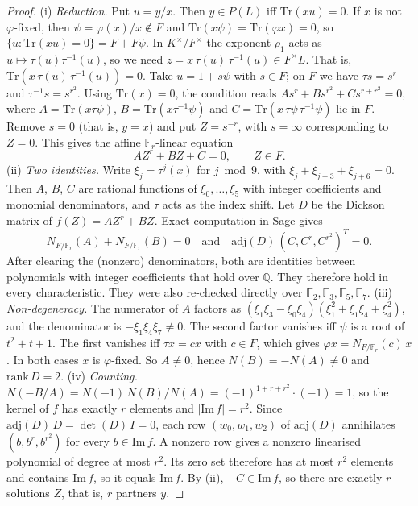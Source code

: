 \documentclass[11pt]{article}
\begin{document}
\begin{proof}
(i) \emph{Reduction.} Put $u=y/x$. Then $y\in P(L)$ iff $\mathrm{Tr}(xu)=0$. If $x$ is not $\varphi$-fixed, then $\psi=\varphi(x)/x\notin F$ and
$\mathrm{Tr}(x\psi)=\mathrm{Tr}(\varphi x)=0$, so $\{u:\mathrm{Tr}(xu)=0\}=F+F\psi$.
In $K^\times/F^\times$ the exponent $\rho_1$ acts as $u\mapsto\tau(u)\tau^{-1}(u)$, so we need $z=x\,\tau(u)\,\tau^{-1}(u)\in F^\times L$. That is, $\mathrm{Tr}(x\,\tau(u)\,\tau^{-1}(u))=0$.
Take $u=1+s\psi$ with $s\in F$; on $F$ we have $\tau s=s^r$ and $\tau^{-1}s=s^{r^2}$. Using $\mathrm{Tr}(x)=0$, the condition reads $As^r+Bs^{r^2}+Cs^{r+r^2}=0$, where
$A=\mathrm{Tr}(x\tau\psi)$, $B=\mathrm{Tr}(x\tau^{-1}\psi)$ and $C=\mathrm{Tr}(x\,\tau\psi\,\tau^{-1}\psi)$ lie in $F$.
Remove $s=0$ (that is, $y=x$) and put $Z=s^{-r}$, with $s=\infty$ corresponding to $Z=0$. This gives the affine $\mathbb F_r$-linear equation
\[A Z^r+BZ+C=0,\qquad Z\in F.\]
(ii) \emph{Two identities.} Write $\xi_j=\tau^j(x)$ for $j\bmod 9$, with $\xi_j+\xi_{j+3}+\xi_{j+6}=0$. Then $A$, $B$, $C$ are rational functions of $\xi_0,\dots,\xi_5$
with integer coefficients and monomial denominators, and $\tau$ acts as the index shift. Let $D$ be the Dickson matrix of $f(Z)=AZ^r+BZ$. Exact computation in Sage gives
\[N_{F/\mathbb F_r}(A)+N_{F/\mathbb F_r}(B)=0\quad\text{and}\quad \mathrm{adj}(D)\,(C,C^r,C^{r^2})^{T}=0.\]
After clearing the (nonzero) denominators, both are identities between polynomials with integer coefficients that hold over $\mathbb Q$. They therefore hold in every characteristic.
They were also re-checked directly over $\mathbb F_2,\mathbb F_3,\mathbb F_5,\mathbb F_7$.
(iii) \emph{Non-degeneracy.} The numerator of $A$ factors as $(\xi_1\xi_3-\xi_0\xi_4)(\xi_1^2+\xi_1\xi_4+\xi_4^2)$, and the denominator is $-\xi_1\xi_4\xi_7\ne0$.
The second factor vanishes iff $\psi$ is a root of $t^2+t+1$. The first vanishes iff $\tau x=cx$ with $c\in F$, which gives $\varphi x=N_{F/\mathbb F_r}(c)\,x$.
In both cases $x$ is $\varphi$-fixed. So $A\ne0$, hence $N(B)=-N(A)\ne0$ and $\mathrm{rank}\,D=2$.
(iv) \emph{Counting.} $N(-B/A)=N(-1)\,N(B)/N(A)=(-1)^{1+r+r^2}\cdot(-1)=1$, so the kernel of $f$ has exactly $r$ elements and $|\mathrm{Im}\,f|=r^2$.
Since $\mathrm{adj}(D)\,D=\det(D)\,I=0$, each row $(w_0,w_1,w_2)$ of $\mathrm{adj}(D)$ annihilates $(b,b^r,b^{r^2})$ for every $b\in\mathrm{Im}\,f$.
A nonzero row gives a nonzero linearised polynomial of degree at most $r^2$. Its zero set therefore has at most $r^2$ elements and contains $\mathrm{Im}\,f$, so it equals $\mathrm{Im}\,f$.
By (ii), $-C\in\mathrm{Im}\,f$, so there are exactly $r$ solutions $Z$, that is, $r$ partners $y$.

\end{proof}
\end{document}
